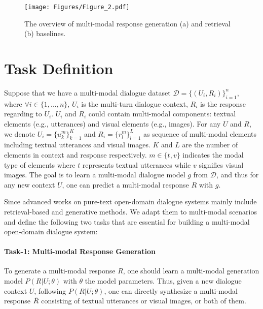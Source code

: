\documentclass[11pt]{article}
\begin{document}
%
 \begin{figure*}[bht]
\centering
     \texttt{[image: Figures/Figure\_2.pdf]}
     \caption{The overview of multi-modal response generation (a) and retrieval (b) baselines.}
     \label{fig:model}
     \vspace{-5mm}
\end{figure*}



\section{Task Definition}
Suppose that we have a multi-modal dialogue dataset $\mathcal{D} =\{(U_i, R_i)\}_{i=1}^n$, where $\forall i \in \{1, ..., n\}$, $U_i$ is the multi-turn dialogue context, $R_i$ is the response regarding to $U_i$. $U_i$ and $R_i$ could contain multi-modal components: textual elements (e.g., utterances) and visual elements (e.g., images). For any $U$ and $R$, we denote $U_i = \{ u^m_k \}_{k=1}^{K}$ and $R_i = \{ r^m_l\}_{l=1}^{L}$ as sequence of multi-modal elements including textual utterances and visual images. $K$ and $L$ are the number of elements in context and response respectively. $m \in \{t, v\}$ indicates the modal type of elements where $t$ represents textual utterances while $v$ signifies visual images. The goal is to learn a multi-modal dialogue model $g$ from $\mathcal{D}$, and thus for any new context $U$, one can predict a multi-modal response $R$ with $g$. 

Since advanced works on pure-text open-domain dialogue systems mainly include retrieval-based  and generative methods. We adapt them to multi-modal scenarios and define the following two tasks that are essential for building a multi-modal open-domain dialogue system:

\paragraph{Task-1: Multi-modal Response Generation}
To generate a multi-modal response $R$, one should learn a multi-modal generation model $P(R|U;\theta)$ with $\theta$ the model parameters. Thus, given a new dialogue context $U$,  following $P(R|U;\theta)$, one can directly synthesize a multi-modal response $\Tilde{R}$ consisting of textual utterances or visual images, or both of them.
\end{document}
